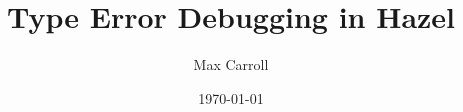 \title{Type Error Debugging in Hazel}
\newcommand{\thesubtitle}{}
\author{Max Carroll}
\date{\today}
\newcommand{\tripos}{Computer Science Tripos, Part II}
\newcommand{\degree}{Bachelor of Arts}
\newcommand{\university}{University of Cambridge}
\newcommand{\college}{Sidney Sussex College}
\newcommand{\supervisors}{Patrick Ferris, Anil Madhavapeddy}
\newcommand{\candidatenumber}{2328E}
\newcommand{\submissiondeadline}{05/2025}
\newcommand{\projectoriginator}{The Candidate}